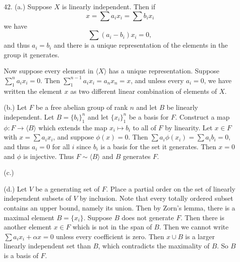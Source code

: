 \documentclass[12pt, reqno]{article}
\theoremstyle{plain}
\theoremstyle{definition}
\theoremstyle{remark}
\begin{document}
\begin{enumerate}
    \item[42.] (a.) Suppose $X$ is linearly independent. Then if 
    \[
        x = \sum a_i x_i = \sum b_i x_i
    \]
    we have 
    \[
        \sum(a_i - b_i) x_i = 0,
    \]
    and thus $a_i = b_i$ and there is a unique representation of the elements in the group it generates. 

    Now suppose every element in $\langle X \rangle$ has a unique representation. Suppose $\sum_1^n a_i x_i = 0$. 
    Then $\sum_1^{n-1} a_i x_i = a_n x_n = x$, and unless every $a_i = 0$, we have written the element 
    $x$ as two different linear combination of elements of $X$. 

    (b.) Let $F$ be a free abelian group of rank $n$ and let $B$ be linearly independent. Let $B = \{b_i\}_1^n$
    and let $\{x_i\}_1^n$ be a basis for $F$. Construct a map $\phi: F \rightarrow \langle B \rangle$ which extends the map $x_i \mapsto b_i$ 
    to all of $F$ by linearity. Let $x \in F$ with $x = \sum a_i x_i$, and suppose $\phi(x) = 0$.
    Then $\sum a_i \phi(x_i) = \sum a_i b_i = 0$, and thus $a_i = 0$ for all $i$ since $b_i$ is a 
    basis for the set it generates. Then $x = 0$ and $\phi$ is injective. Thus $F \sim \langle B \rangle$ and 
    $B$ generates $F$. 

    (c.)

    (d.) Let $V$ be a generating set of $F$. Place a partial order on the set of linearly independent subsets of $V$ by inclusion.
    Note that every totally ordered subset contains an upper bound, namely its union. Then by Zorn's lemma,
    there is a maximal element $B = \{x_i\}$. Suppose $B$ does not generate $F$. Then there is another element 
    $x \in F$ which is not in the span of $B$. Then we cannot write $\sum a_i x_i + \alpha x = 0$ unless 
    every coefficient is zero. Then $x \cup B$ is a larger linearly independent set than $B$, which contradicts
    the maximality of $B$. So $B$ is a basis of $F$.

\end{enumerate}
\end{document}
